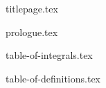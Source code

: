 \documentclass[twoside]{report}
\begin{document}
{titlepage.tex}

\tableofcontents

\setcounter{chapter}{-1}

{prologue.tex}

{table-of-integrals.tex}

{table-of-definitions.tex}
\end{document}
